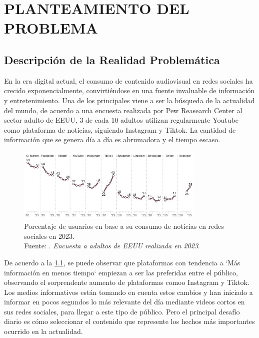 \chapter{PLANTEAMIENTO DEL PROBLEMA}
\section{Descripción de la Realidad Problemática}

En la era digital actual, el consumo de contenido audiovisual en redes sociales ha crecido exponencialmente, convirtiéndose en una fuente invaluable de información y entretenimiento. 
Una de los principales viene a ser la búsqueda de la actualidad del mundo, de acuerdo a una encuesta realizada por Pew Reasearch Center al sector adulto de EEUU, 3 de cada 10 adultos utilizan regularmente Youtube como plataforma de noticias, siguiendo Instagram y Tiktok. La cantidad de información que se genera día a día es abrumadora y el tiempo escaso.

\begin{figure}[h]
    \begin{center}
        \includegraphics[width=0.80\textwidth]{1/figures/Tendencias_Redes_2023.jpg}
        \caption[Porcentaje de usuarios en base a su consumo de noticias en redes sociales en 2023]{Porcentaje de usuarios en base a su consumo de noticias en redes sociales en 2023. \\ Fuente: \cite{pewresearch_cite}. \textit{Encuesta a adultos de EEUU realizada en 2023}.}
        \label{1:fig}
    \end{center}
\end{figure}

De acuerdo a la \ref{1:fig}, se puede observar que plataformas con tendencia a `Más información en menos tiempo` empiezan a ser las preferidas entre el público, observando el sorprendente aumento de plataformas comoo Instagram y Tiktok. 
Los medios informativos están tomando en cuenta estos cambios y han iniciado a informar en pocos segundos lo más relevante del día mediante videos cortos en sus redes sociales, para llegar a este tipo de público.
Pero el principal desafío diario es cómo seleccionar el contenido que represente los hechos más importantes ocurrido en la actualidad.

